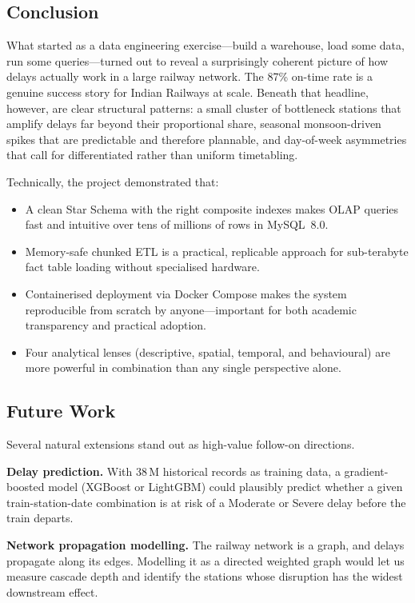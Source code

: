\documentclass[conference]{IEEEtran}
\begin{document}
\subsection{Conclusion}

What started as a data engineering exercise---build a warehouse, load
some data, run some queries---turned out to reveal a surprisingly
coherent picture of how delays actually work in a large railway network.
The 87\% on-time rate is a genuine success story for Indian Railways at
scale.
Beneath that headline, however, are clear structural patterns: a small
cluster of bottleneck stations that amplify delays far beyond their
proportional share, seasonal monsoon-driven spikes that are predictable and
therefore plannable, and day-of-week asymmetries that call for
differentiated rather than uniform timetabling.

Technically, the project demonstrated that:
\begin{itemize}
  \item A clean Star Schema with the right composite indexes makes OLAP
        queries fast and intuitive over tens of millions of rows in
        MySQL~8.0.
  \item Memory-safe chunked ETL is a practical, replicable approach for
        sub-terabyte fact table loading without specialised hardware.
  \item Containerised deployment via Docker Compose makes the system
        reproducible from scratch by anyone---important for both academic
        transparency and practical adoption.
  \item Four analytical lenses (descriptive, spatial, temporal, and
        behavioural) are more powerful in combination than any single
        perspective alone.
\end{itemize}

\subsection{Future Work}

Several natural extensions stand out as high-value follow-on directions.

\textbf{Delay prediction.}
With 38\,M historical records as training data, a gradient-boosted model
(XGBoost or LightGBM) could plausibly predict whether a given
train-station-date combination is at risk of a Moderate or Severe delay
before the train departs.

\textbf{Network propagation modelling.}
The railway network is a graph, and delays propagate along its edges.
Modelling it as a directed weighted graph would let us measure cascade
depth and identify the stations whose disruption has the widest downstream
effect.
\end{document}
